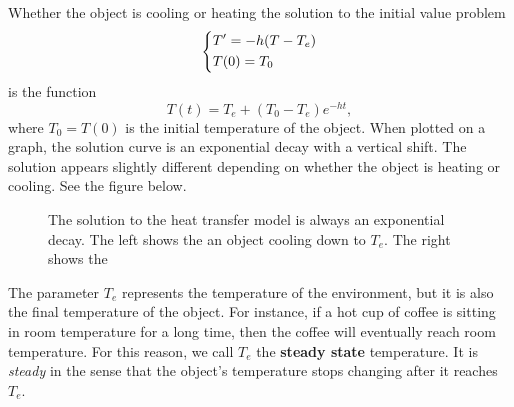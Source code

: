 \documentclass[10pt,letterpaper]{article}
\begin{document}
Whether the object is cooling or heating the solution to the initial value problem 
$$
\begin{dcases}
    T' = -h(T-T_e) \\
    T(0)=T_0
\end{dcases}
$$
is the function 
\[
T(t) = T_e + (T_0 - T_e)e^{-ht},
\]
where $T_0=T(0)$ is the initial temperature of the object. When plotted on a graph, the solution curve is an exponential decay with a vertical shift. The solution appears slightly different depending on whether the object is heating or cooling. See the figure below. 
\begin{figure}[H]
    \centering
{}
    \caption{The solution to the heat transfer model is always an exponential decay. The left shows the an object cooling down to $T_e$. The right shows the }
\end{figure}
The parameter $T_e$ represents the temperature of the environment, but it is also the final temperature of the object. For instance, if a hot cup of coffee is sitting in room temperature for a long time, then the coffee will eventually reach room temperature. For this reason, we call $T_e$ the \textbf{steady state} temperature. It is \textit{steady} in the sense that the object's temperature stops changing after it reaches $T_e$. 
\end{document}
